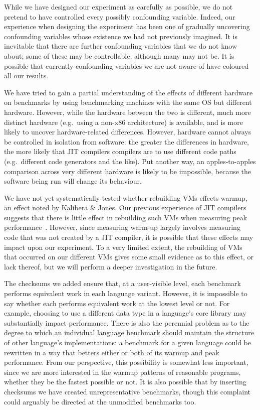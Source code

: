 \documentclass[a4paper,UKenglish]{lipics}
\newcommand{\kalibera}{Kalibera \& Jones\xspace}
\begin{document}
While we have designed our experiment as carefully as possible, we do not
pretend to have controlled every possibly confounding variable. Indeed, our
experience when designing the experiment has been one of gradually uncovering
confounding variables whose existence we had not previously imagined. It
is inevitable that there are further confounding variables that we
do not know about; some of these may be controllable, although many may not be.
It is possible that currently confounding variables we are not aware of have
coloured all our results.

We have tried to gain a partial understanding of the effects of different
hardware on benchmarks by using benchmarking machines with the same OS but
different hardware. However, while the hardware between the two is
different, much more distinct hardware (e.g.~using a non-x86 architecture) is
available, and is more likely to uncover hardware-related differences.
However, hardware cannot always be controlled in isolation from software:
the greater the differences in hardware, the more likely that JIT compilers
compilers are to use different code paths (e.g.~different code generators and
the like). Put another way, an apples-to-apples comparison across very different
hardware is likely to be impossible, because the software being run will
change its behaviour.

We have not yet systematically tested whether rebuilding VMs effects warmup, an
effect noted by \kalibera. Our previous experience of JIT compilers suggests
that there is little effect in rebuilding such VMs when measuring peak
performance~\cite{barrett15approaches}. However, since measuring warm-up largely
involves measuring code that was not created by a JIT compiler, it is possible
that these effects may impact upon our experiment. To a very limited extent, the
rebuilding of VMs that occurred on our different VMs gives some small evidence
as to this effect, or lack thereof, but we will perform a deeper investigation
in the future.

The checksums we added ensure that, at a user-visible level, each benchmark
performs equivalent work in each language variant. However, it is impossible to
say whether each performs equivalent work at the lowest level or not. For
example, choosing to use a different data type in a language's core library may
substantially impact performance. There is also the perennial problem as to the
degree to which an individual language benchmark should maintain the structure
of other language's implementations: a benchmark for a given language could be
rewritten in a way that betters either or both of its warmup and peak
performance. From our perspective, this possibility is somewhat less important,
since we are more interested in the warmup patterns of reasonable programs,
whether they be the fastest possible or not. It is also possible that by
inserting checksums we have created unrepresentative benchmarks, though
this complaint could arguably be directed at the unmodified benchmarks too.
\end{document}
